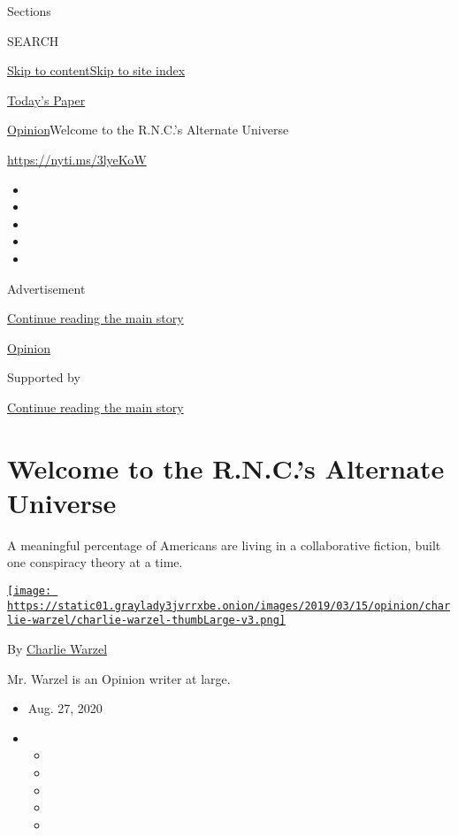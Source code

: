 Sections

SEARCH

\protect\hyperlink{site-content}{Skip to
content}\protect\hyperlink{site-index}{Skip to site index}

\href{https://myaccount.nytimes3xbfgragh.onion/auth/login?response_type=cookie\&client_id=vi}{}

\href{https://www.nytimes3xbfgragh.onion/section/todayspaper}{Today's
Paper}

\href{/section/opinion}{Opinion}\textbar{}Welcome to the R.N.C.'s
Alternate Universe

\url{https://nyti.ms/3lyeKoW}

\begin{itemize}
\item
\item
\item
\item
\item
\end{itemize}

Advertisement

\protect\hyperlink{after-top}{Continue reading the main story}

\href{/section/opinion}{Opinion}

Supported by

\protect\hyperlink{after-sponsor}{Continue reading the main story}

\hypertarget{welcome-to-the-rncs-alternate-universe}{%
\section{Welcome to the R.N.C.'s Alternate
Universe}\label{welcome-to-the-rncs-alternate-universe}}

A meaningful percentage of Americans are living in a collaborative
fiction, built one conspiracy theory at a time.

\href{https://www.nytimes3xbfgragh.onion/by/charlie-warzel}{\texttt{[image: https://static01.graylady3jvrrxbe.onion/images/2019/03/15/opinion/charlie-warzel/charlie-warzel-thumbLarge-v3.png]}}

By \href{https://www.nytimes3xbfgragh.onion/by/charlie-warzel}{Charlie
Warzel}

Mr. Warzel is an Opinion writer at large.

\begin{itemize}
\item
  Aug. 27, 2020
\item
  \begin{itemize}
  \item
  \item
  \item
  \item
  \item
  \end{itemize}
\end{itemize}

